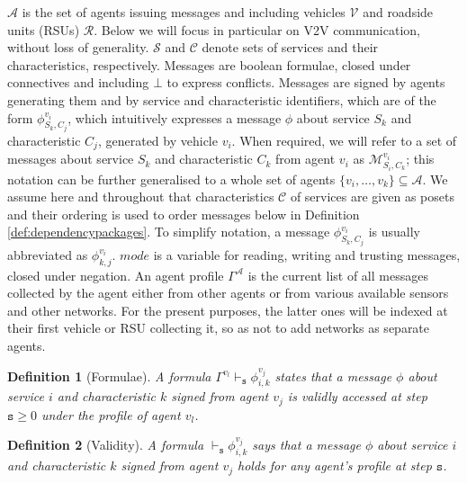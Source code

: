 \documentclass[compsoc, conference, letterpaper, 10pt, times]{IEEEtran}
\newtheorem{definition}{Definition}
\begin{document}
$\mathcal{A}$ is the set of agents issuing messages and including vehicles $\mathcal{V}$ and roadside units (RSUs) $\mathcal{R}$. Below we will focus in particular on V2V communication, without loss of generality. $\mathcal{S}$ and $\mathcal{C}$ denote sets of services and their characteristics, respectively. Messages are boolean formulae, closed under connectives and including $\bot$ to express conflicts. Messages are signed by agents generating them and by service and characteristic identifiers, which are of the form $\phi^{v_{i}}_{S_{k},C_{j}}$, which intuitively expresses a  message $\phi$ about service $S_k$ and characteristic $C_j$,  generated by vehicle $v_{i}$. When required, we will refer to a set of messages about service $S_{k}$ and characteristic $C_{k}$ from agent $v_{i}$ as $\mathcal{M}^{v_{i}}_{S_{i}, C_{k}}$; this notation can be further generalised to a whole set of agents $\{v_{i}, \dots, v_{k}\} \subseteq  \mathcal{A}$. We assume here and throughout that characteristics $\mathcal{C}$ of services are given as posets and their ordering is used to order messages below in Definition \ref{def:dependencypackages}. 
To simplify notation, a message $\phi^{v_{i}}_{S_{k},C_{j}}$ is usually abbreviated as $\phi^{v_{i}}_{{k},{j}}$. $mode$ is a variable for reading, writing and trusting messages, closed under negation. An agent profile $\Gamma^{\mathcal{A}}$ is the current list of all messages collected by the agent either from other agents or from various available sensors and other networks. For the present purposes, the latter ones will be indexed at their first vehicle or RSU collecting it, so as not to add networks as separate agents.


\begin{definition}[Formulae]
A formula $\Gamma^{v_l} \vdash_{\mathtt{s}} \phi^{v_{j}}_{i,k}$ states that a message $\phi$ about service $i$ and characteristic $k$ signed from agent $v_{j}$  is validly accessed at step $\mathtt{s}\geq 0$ under the profile of agent $v_{l}$.
\end{definition}

\begin{definition}[Validity]
A formula $\vdash_{\mathtt{s}} \phi^{v_{j}}_{i,k}$ says that a message $\phi$  about service $i$ and characteristic $k$ signed from agent $v_{j}$ holds for \textit{any} agent's profile at step $\mathtt{s}$.
\end{definition}
\end{document}
